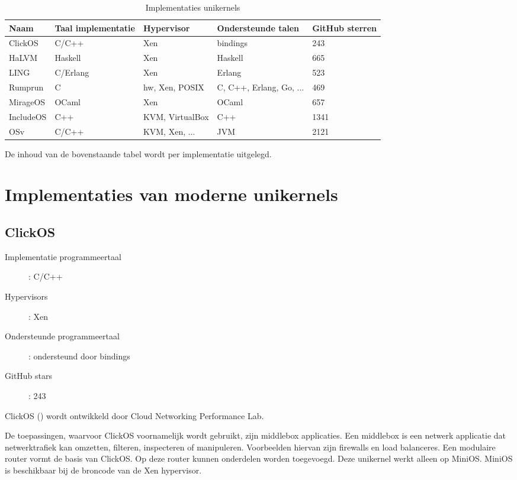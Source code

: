 \begin{table}[ht]
\caption{Implementaties unikernels}
\begin{center}
    \begin{tabular}{| l | l | l | l | l |}
    \hline
    Naam & Taal implementatie & Hypervisor & Ondersteunde talen & GitHub sterren \\ \hline
    ClickOS & C/C++ & Xen & bindings & 243 \\ \hline
    HaLVM & Haskell & Xen & Haskell & 665 \\ \hline
    LING & C/Erlang & Xen & Erlang & 523 \\ \hline
    Rumprun & C & hw, Xen, POSIX & C, C++, Erlang, Go, ... & 469 \\ \hline
    MirageOS & OCaml & Xen & OCaml & 657 \\ \hline
    IncludeOS & C++ & KVM, VirtualBox & C++ & 1341 \\ \hline
    OSv & C/C++ & KVM, Xen, ... & JVM & 2121 \\ \hline
    \end{tabular}
\end{center}
\label{tab:impl_unikernels}
\end{table}

De inhoud van de bovenstaande tabel wordt per implementatie uitgelegd.

\newpage

\section{Implementaties van moderne unikernels}

\subsection{ClickOS}
\begin{description}
  \item [Implementatie programmeertaal]: C/C++
  \item [Hypervisors]: Xen
  \item [Ondersteunde programmeertaal]: ondersteund door bindings
  \item [GitHub stars]: 243
\end{description}

ClickOS  (\cite{martins_clickos_2014}) wordt ontwikkeld door Cloud Networking Performance Lab.

De toepassingen, waarvoor ClickOS voornamelijk wordt gebruikt, zijn middlebox applicaties. Een middlebox is een netwerk applicatie dat netwerktrafiek kan omzetten, filteren, inspecteren of manipuleren. Voorbeelden hiervan zijn firewalls en load balanceres.
Een modulaire router vormt de basis van ClickOS. Op deze router kunnen onderdelen worden toegevoegd. Deze unikernel werkt alleen op MiniOS. MiniOS is beschikbaar bij de broncode van de Xen hypervisor.


